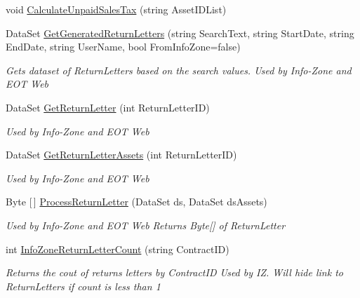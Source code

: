 \begin{DoxyCompactItemize}
void \mbox{\hyperlink{class_g_f_s_c_1_1_services_1_1_end_of_term_1_1_end_of_term_service_af1b4d8d2fa58ce72472426276c69aac0}{Calculate\+Unpaid\+Sales\+Tax}} (string Asset\+I\+D\+List)
\item 
Data\+Set \mbox{\hyperlink{class_g_f_s_c_1_1_services_1_1_end_of_term_1_1_end_of_term_service_a2953910fc8e2599fdc524fd411e6bc09}{Get\+Generated\+Return\+Letters}} (string Search\+Text, string Start\+Date, string End\+Date, string User\+Name, bool From\+Info\+Zone=false)
\begin{DoxyCompactList}\small\item\em Gets dataset of Return\+Letters based on the search values. Used by Info-\/\+Zone and E\+OT Web \end{DoxyCompactList}\item 
Data\+Set \mbox{\hyperlink{class_g_f_s_c_1_1_services_1_1_end_of_term_1_1_end_of_term_service_a8b73d602cbe6591822f1bdffb30f0860}{Get\+Return\+Letter}} (int Return\+Letter\+ID)
\begin{DoxyCompactList}\small\item\em Used by Info-\/\+Zone and E\+OT Web \end{DoxyCompactList}\item 
Data\+Set \mbox{\hyperlink{class_g_f_s_c_1_1_services_1_1_end_of_term_1_1_end_of_term_service_a02bec860788f7d8863e1e408674e7448}{Get\+Return\+Letter\+Assets}} (int Return\+Letter\+ID)
\begin{DoxyCompactList}\small\item\em Used by Info-\/\+Zone and E\+OT Web \end{DoxyCompactList}\item 
Byte \mbox{[}$\,$\mbox{]} \mbox{\hyperlink{class_g_f_s_c_1_1_services_1_1_end_of_term_1_1_end_of_term_service_a333d59240ab862fff560fe3af9a9e1ed}{Process\+Return\+Letter}} (Data\+Set ds, Data\+Set ds\+Assets)
\begin{DoxyCompactList}\small\item\em Used by Info-\/\+Zone and E\+OT Web Returns Byte\mbox{[}\mbox{]} of Return\+Letter \end{DoxyCompactList}\item 
int \mbox{\hyperlink{class_g_f_s_c_1_1_services_1_1_end_of_term_1_1_end_of_term_service_a551aee105ba7f4f765f07f749632e859}{Info\+Zone\+Return\+Letter\+Count}} (string Contract\+ID)
\begin{DoxyCompactList}\small\item\em Returns the cout of returns letters by Contract\+ID Used by IZ. Will hide link to Return\+Letters if count is less than 1 \end{DoxyCompactList}\end{DoxyCompactItemize}


